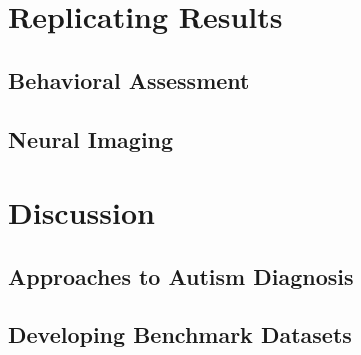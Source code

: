 \documentclass[letterpaper]{article}
\begin{document}
\section{Replicating Results} \label{sec:repres}
\subsection{Behavioral Assessment}
\subsection{Neural Imaging}

\section{Discussion}
\subsection{Approaches to Autism Diagnosis}
\subsection{Developing Benchmark Datasets}


\newpage
\printbibliography[heading=bibintoc, title={Bibliography}]
\end{document}
